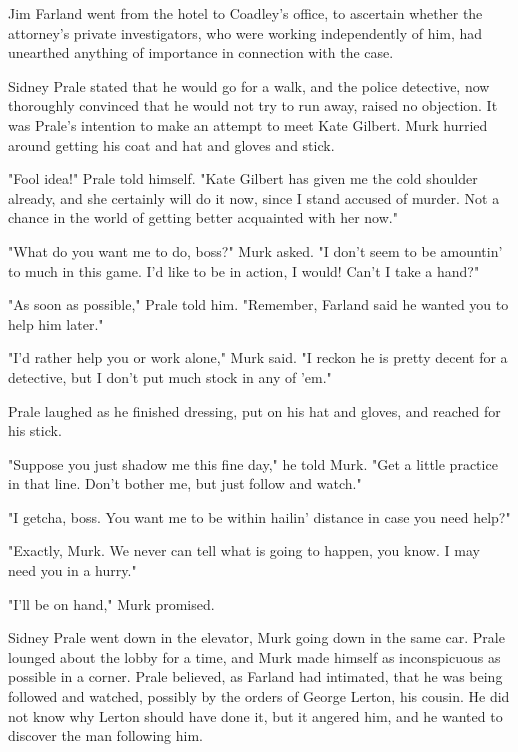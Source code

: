 \documentclass{novel}
\begin{document}
\vspace{2\nbs}
\clearpage
\thispagestyle{empty}

\begin{ChapterStart}
\vspace{3\nbs}
\end{ChapterStart}
    
Jim Farland went from the hotel to Coadley's office, to ascertain whether the attorney's private investigators, who were working independently of him, had unearthed anything of importance in connection with the case.

Sidney Prale stated that he would go for a walk, and the police detective, now thoroughly convinced that he would not try to run away, raised no objection. It was Prale's intention to make an attempt to meet Kate Gilbert. Murk hurried around getting his coat and hat and gloves and stick.

"Fool idea!" Prale told himself. "Kate Gilbert has given me the cold shoulder already, and she certainly will do it now, since I stand accused of murder. Not a chance in the world of getting better acquainted with her now."

"What do you want me to do, boss?" Murk asked. "I don't seem to be amountin' to much in this game. I'd like to be in action, I would! Can't I take a hand?"

"As soon as possible," Prale told him. "Remember, Farland said he wanted you to help him later."

"I'd rather help you or work alone," Murk said. "I reckon he is pretty decent for a detective, but I don't put much stock in any of 'em."

Prale laughed as he finished dressing, put on his hat and gloves, and reached for his stick.

"Suppose you just shadow me this fine day," he told Murk. "Get a little practice in that line. Don't bother me, but just follow and watch."

"I getcha, boss. You want me to be within hailin' distance in case you need help?"

"Exactly, Murk. We never can tell what is going to happen, you know. I may need you in a hurry."

"I'll be on hand," Murk promised.

Sidney Prale went down in the elevator, Murk going down in the same car. Prale lounged about the lobby for a time, and Murk made himself as inconspicuous as possible in a corner. Prale believed, as Farland had intimated, that he was being followed and watched, possibly by the orders of George Lerton, his cousin. He did not know why Lerton should have done it, but it angered him, and he wanted to discover the man following him.
\end{document}
